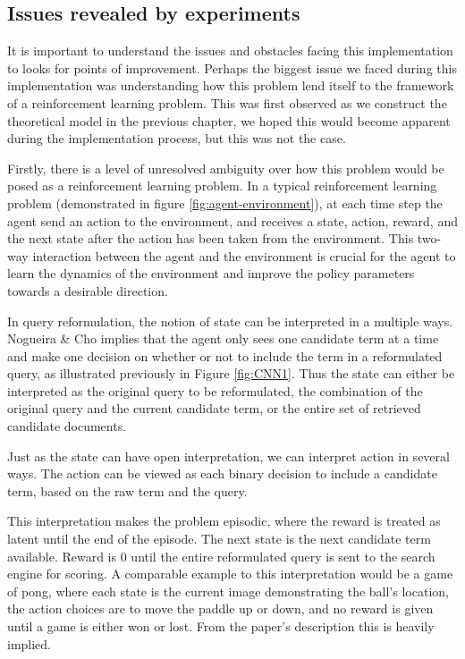 \subsection{Issues revealed by experiments}


It is important to understand the issues and obstacles facing this implementation to looks for points of improvement. Perhaps the biggest issue we faced during this implementation was understanding how this problem lend itself to the framework of a reinforcement learning problem. This was first observed as we construct the theoretical model in the previous chapter, we hoped this would become apparent during the implementation process, but this was not the case.

Firstly, there is a level of unresolved ambiguity over how this problem would be posed as a reinforcement learning problem. In a typical reinforcement learning problem (demonstrated in figure \ref{fig:agent-environment}), at each time step the agent send an action to the environment, and receives a state, action, reward, and the next state after the action has been taken from the environment. This two-way interaction between the agent and the environment is crucial for the agent to learn the dynamics of the environment and improve the policy parameters towards a desirable direction. 

In query reformulation, the notion of state can be interpreted in a multiple ways.  Nogueira \& Cho\cite{nogueira2017task} implies that the agent only sees one candidate term at a time and make one decision on whether or not to include the term in a reformulated query, as illustrated previously in Figure \ref{fig:CNN1}.  Thus the state can either be interpreted as the original query to be reformulated, the combination of the original query and the current candidate term, or the entire set of retrieved candidate documents. 

Just as the state can have open interpretation, we can interpret action in several ways. The action can be viewed as each binary decision to include a candidate term, based on the raw term and the query. 

This interpretation makes the problem episodic, where the reward is treated as latent until the end of the episode. The next state is the next candidate term available. Reward is 0 until the entire reformulated query is sent to the search engine for scoring. A comparable example to this interpretation would be a game of pong, where each state is the current image demonstrating the ball's location, the action choices are to move the paddle up or down, and no reward is given until a game is either won or lost.  From the paper's description this is heavily implied. 

